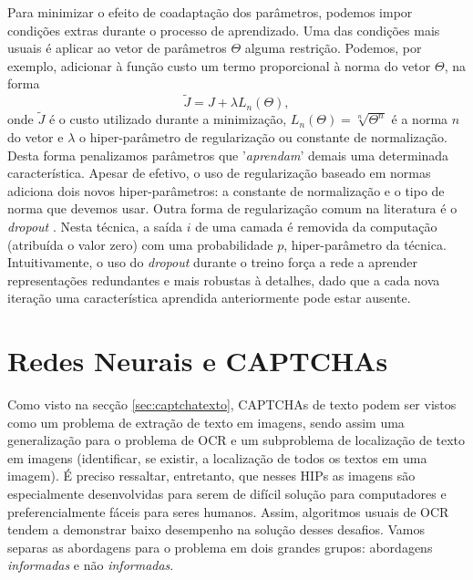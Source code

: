 Para minimizar o efeito de coadaptação dos parâmetros, podemos impor condições extras durante o processo de aprendizado. Uma das condições mais usuais é aplicar ao vetor de parâmetros $\Theta$ alguma restrição. Podemos, por exemplo, adicionar à função custo um termo proporcional à norma do vetor $\Theta$, na forma
\begin{equation}
\tilde{J} = J + \lambda L_n(\Theta),
\end{equation}
onde $\tilde{J}$ é o custo utilizado durante a minimização, $L_n(\Theta) = \sqrt[n]{\Theta^n}$ é a norma $n$ do vetor e $\lambda$ o hiper-parâmetro de regularização ou constante de normalização. Desta forma penalizamos parâmetros que '\textit{aprendam}' demais uma determinada característica. Apesar de efetivo, o uso de regularização baseado em normas adiciona dois novos hiper-parâmetros: a constante de normalização e o tipo de norma que devemos usar. Outra forma de regularização comum na literatura é o \textit{dropout} \cite{hinton2012improving}. Nesta técnica, a saída $i$ de uma camada é removida da computação (atribuída o valor zero) com uma probabilidade $p$, hiper-parâmetro da técnica. Intuitivamente, o uso do \textit{dropout} durante o treino força a rede a aprender representações redundantes e mais robustas à detalhes, dado que a cada nova iteração uma característica aprendida anteriormente pode estar ausente.



\section{Redes Neurais e CAPTCHAs}

Como visto na secção \ref{sec:captchatexto}, CAPTCHAs de texto podem ser vistos como um problema de extração de texto em imagens, sendo assim uma generalização para o problema de OCR e um subproblema de localização de texto em imagens (identificar, se existir, a localização de todos os textos em uma imagem). É preciso ressaltar, entretanto, que nesses HIPs as imagens são especialmente desenvolvidas para serem de difícil solução para computadores e preferencialmente fáceis para seres humanos. Assim, algoritmos usuais de OCR tendem a demonstrar baixo desempenho na solução desses desafios. Vamos separas as abordagens para o problema em dois grandes grupos: abordagens \textit{informadas} e não \textit{informadas}.

